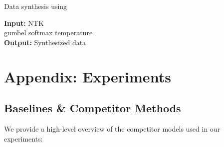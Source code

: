 \documentclass{article}
\begin{document}
\begin{algorithm}[H]
\centering
\caption{Data synthesis using \sampler} \label{alg:distill}
    \begin{flushleft}
        \textbf{Input:}  NTK  \\
        gumbel softmax temperature  \\
        \textbf{Output:} Synthesized data 
    \end{flushleft}
    \begin{algorithmic}[1]
            \State  {}
            \State  {}
            \State \Return 
        \EndProcedure
    
            \State  {}
            \For{}
                \State 
                \State  
                \State 
                \State 
                \State  {}
                \State  {}
                \State  {}
            \EndFor
            \State \Return 
        \EndProcedure
    \end{algorithmic}
\end{algorithm} 
\section{Appendix: Experiments} \label{appendix:experiments}

\subsection{Baselines \& Competitor Methods} \label{appendix:competitors}

We provide a high-level overview of the competitor models used in our experiments:
\end{document}
